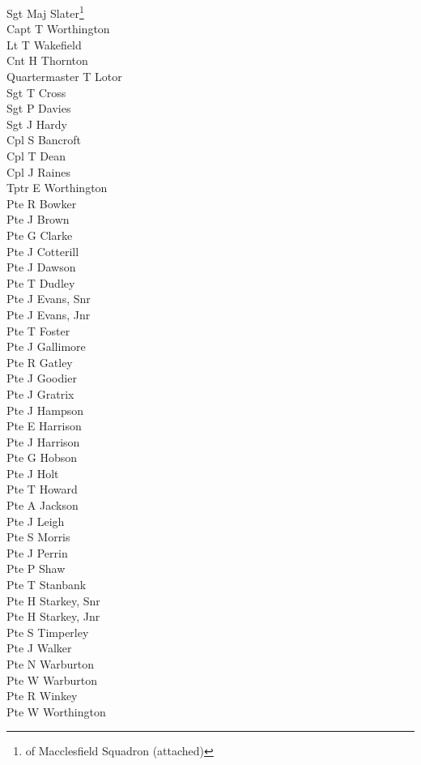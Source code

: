 \begin{multicols}{3}
  \small
  \noindent
  Sgt Maj Slater\footnote{of Macclesfield Squadron (attached)} \\
  Capt T Worthington \\
  Lt T Wakefield \\
  Cnt H Thornton \\
  Quartermaster T Lotor \\
  Sgt T Cross \\
  Sgt P Davies \\
  Sgt J Hardy \\
  Cpl S Bancroft \\
  Cpl T Dean \\
  Cpl J Raines \\
  Tptr E Worthington \\
  Pte R Bowker \\
  Pte J Brown \\
  Pte G Clarke \\
  Pte J Cotterill \\
  Pte J Dawson \\
  Pte T Dudley \\
  Pte J Evans, Snr \\
  Pte J Evans, Jnr \\
  Pte T Foster \\
  Pte J Gallimore \\
  Pte R Gatley \\
  Pte J Goodier \\
  Pte J Gratrix \\
  Pte J Hampson \\
  Pte E Harrison \\
  Pte J Harrison \\
  Pte G Hobson \\
  Pte J Holt \\
  Pte T Howard \\
  Pte A Jackson \\
  Pte J Leigh \\
  Pte S Morris \\
  Pte J Perrin \\
  Pte P Shaw \\
  Pte T Stanbank \\
  Pte H Starkey, Snr \\
  Pte H Starkey, Jnr \\
  Pte S Timperley \\
  Pte J Walker \\
  Pte N Warburton \\
  Pte W Warburton \\
  Pte R Winkey \\
  Pte W Worthington \\
\end{multicols}

